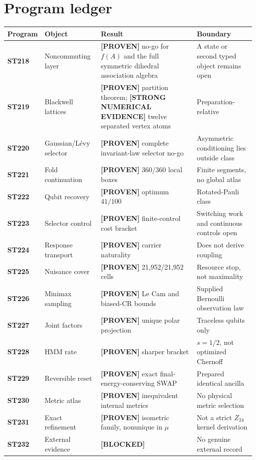 \documentclass[11pt,a4paper]{article}
\newcommand{\Proven}{\textcolor{proved}{\textbf{[PROVEN]}}}
\newcommand{\Evidence}{\textcolor{conditional}{\textbf{[STRONG NUMERICAL EVIDENCE]}}}
\newcommand{\Blocked}{\textcolor{blocked}{\textbf{[BLOCKED]}}}
\begin{document}
\section{Program ledger}

\small
\begin{longtable}{@{}>{\bfseries}p{}p{}p{}p{}@{}}
\toprule
Program & Object & Result & Boundary\\
\midrule
\endhead
ST218 & Noncommuting layer & \Proven{} no-go for $f(A)$ and the full symmetric dihedral association algebra & A state or second typed object remains open\\
ST219 & Blackwell lattices & \Proven{} partition theorem; \Evidence{} twelve separated vertex atoms & Preparation-relative\\
ST220 & Gaussian/L\'evy selector & \Proven{} complete invariant-law selector no-go & Asymmetric conditioning lies outside class\\
ST221 & Fold continuation & \Proven{} 360/360 local boxes & Finite segments, no global atlas\\
ST222 & Qubit recovery & \Proven{} optimum $41/100$ & Rotated-Pauli class\\
ST223 & Selector control & \Proven{} finite-control cost bracket & Switching work and continuous controls open\\
ST224 & Response transport & \Proven{} carrier naturality & Does not derive coupling\\
ST225 & Nuisance cover & \Proven{} 21,952/21,952 cells & Resource stop, not maximality\\
ST226 & Minimax sampling & \Proven{} Le Cam and biased-CR bounds & Supplied Bernoulli observation law\\
ST227 & Joint factors & \Proven{} unique polar projection & Traceless qubits only\\
ST228 & HMM rate & \Proven{} sharper bracket & $s=1/2$, not optimized Chernoff\\
ST229 & Reversible reset & \Proven{} exact final-energy-conserving SWAP & Prepared identical ancilla\\
ST230 & Metric atlas & \Proven{} inequivalent internal metrics & No physical metric selection\\
ST231 & Exact refinement & \Proven{} isometric family, nonunique in $\mu$ & Not a strict $Z_{24}$ kernel derivation\\
ST232 & External evidence & \Blocked{} & No genuine external record\\
\bottomrule
\end{longtable}
\normalsize
\end{document}
